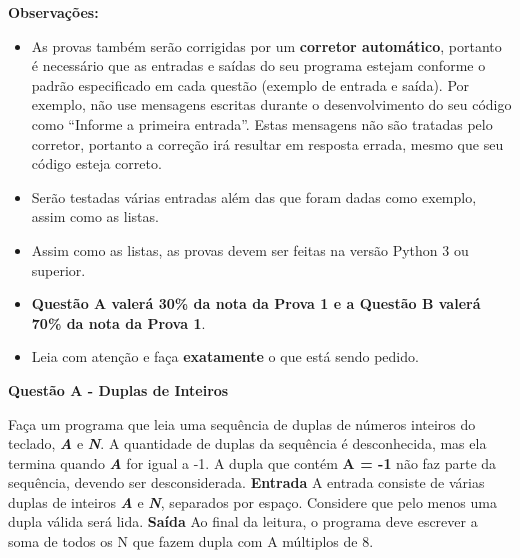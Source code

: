 \documentclass[a4paper, 12pt]{article}
\begin{document}
\textbf{{\large Observações:}}
\begin{itemize}
	\item As provas também serão corrigidas por um \textbf{corretor automático}, portanto é necessário que as entradas e saídas do seu programa estejam conforme o padrão especificado em cada questão (exemplo de entrada e saída). Por exemplo, não use mensagens escritas durante o desenvolvimento do seu código como “Informe a primeira entrada”. Estas mensagens não são tratadas pelo corretor, portanto a correção irá resultar em resposta errada, mesmo que seu código esteja correto.
	\item Serão testadas várias entradas além das que foram dadas como exemplo, assim como as listas.
	\item Assim como as listas, as provas devem ser feitas na versão Python 3 ou superior.
	\item \textbf{Questão A valerá 30\% da nota da Prova 1 e a Questão B valerá 70\% da nota da Prova 1}.
	\item Leia com atenção e faça \textbf{exatamente} o que está sendo pedido.
\end{itemize}
\newpage %
\begin{center}
\textbf{{\Large Questão A - Duplas de Inteiros}}
\end{center}
\vspace{5pt}
Faça um programa que leia uma sequência de duplas de números inteiros do teclado, \textbf{\textit{A}} e \textbf{\textit{N}}. A quantidade de duplas da sequência é desconhecida, mas ela termina quando \textbf{\textit{A}} for igual a -1. A dupla que contém \textbf{A = -1} não faz parte da sequência, devendo ser desconsiderada.
\newline \newline
\textbf{{\large Entrada}} \newline
A entrada consiste de várias duplas de inteiros \textbf{\textit{A}} e \textbf{\textit{N}}, separados por espaço. Considere que pelo menos uma dupla válida será lida.
\newline \newline
\textbf{{\large Saída}} \newline
Ao final da leitura, o programa deve escrever a soma de todos os N que fazem dupla com A múltiplos de 8.
\newline
\end{document}
